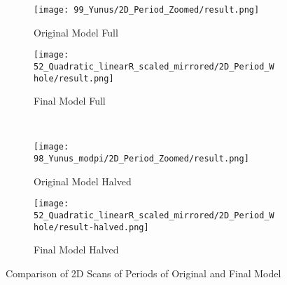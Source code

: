 \begin{figure}
	\centering
	\begin{subfigure}{0.4\textwidth}
		\centering
		\texttt{[image: 99\_Yunus/2D\_Period\_Zoomed/result.png]}
		\caption{Original Model Full}
		\label{fig:quad.final.comparison.og.full}
	\end{subfigure}
	\begin{subfigure}{0.4\textwidth}
		\centering
		\texttt{[image: 52\_Quadratic\_linearR\_scaled\_mirrored/2D\_Period\_Whole/result.png]}
		\caption{Final Model Full}
		\label{fig:quad.final.comparison.fin.full}
	\end{subfigure} \\
	\begin{subfigure}{0.4\textwidth}
		\centering
		\texttt{[image: 98\_Yunus\_modpi/2D\_Period\_Zoomed/result.png]}
		\caption{Original Model Halved}
		\label{fig:quad.final.comparison.og.halved}
	\end{subfigure}
	\begin{subfigure}{0.4\textwidth}
		\centering
		\texttt{[image: 52\_Quadratic\_linearR\_scaled\_mirrored/2D\_Period\_Whole/result-halved.png]}
		\caption{Final Model Halved}
		\label{fig:quad.final.comparison.fin.halved}
	\end{subfigure}
	\caption{Comparison of 2D Scans of Periods of Original and Final Model}
	\label{fig:quad.final.comparison}
\end{figure}
